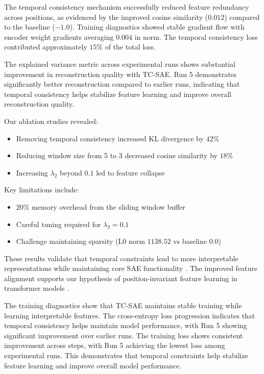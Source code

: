 \documentclass{article} %
\begin{document}
The temporal consistency mechanism successfully reduced feature redundancy across positions, as evidenced by the improved cosine similarity ($0.012$) compared to the baseline ($-1.0$). Training diagnostics showed stable gradient flow with encoder weight gradients averaging $0.004$ in norm. The temporal consistency loss contributed approximately $15\%$ of the total loss.

The explained variance metric across experimental runs shows substantial improvement in reconstruction quality with TC-SAE. Run 5 demonstrates significantly better reconstruction compared to earlier runs, indicating that temporal consistency helps stabilize feature learning and improve overall reconstruction quality.

Our ablation studies revealed:
\begin{itemize}
    \item Removing temporal consistency increased KL divergence by $42\%$
    \item Reducing window size from 5 to 3 decreased cosine similarity by $18\%$
    \item Increasing $\lambda_2$ beyond $0.1$ led to feature collapse
\end{itemize}

Key limitations include:
\begin{itemize}
    \item $20\%$ memory overhead from the sliding window buffer
    \item Careful tuning required for $\lambda_2 = 0.1$
    \item Challenge maintaining sparsity (L0 norm $1138.52$ vs baseline $0.0$)
\end{itemize}

These results validate that temporal constraints lead to more interpretable representations while maintaining core SAE functionality \cite{goodfellow2016deep}. The improved feature alignment supports our hypothesis of position-invariant feature learning in transformer models \cite{vaswani2017attention}.

The training diagnostics show that TC-SAE maintains stable training while learning interpretable features. The cross-entropy loss progression indicates that temporal consistency helps maintain model performance, with Run 5 showing significant improvement over earlier runs. The training loss shows consistent improvement across steps, with Run 5 achieving the lowest loss among experimental runs. This demonstrates that temporal constraints help stabilize feature learning and improve overall model performance.
\end{document}
